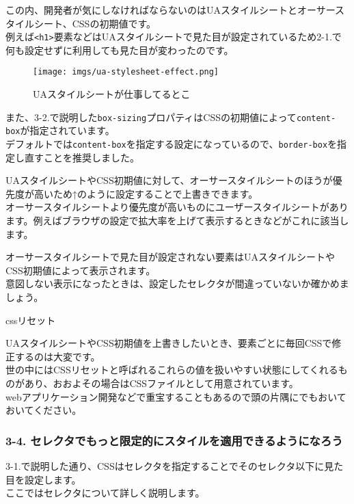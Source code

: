 この内、開発者が気にしなければならないのはUAスタイルシートとオーサースタイルシート、CSSの初期値です。\\
例えば\texttt{\textless{}h1\textgreater{}}要素などはUAスタイルシートで見た目が設定されているため2-1.で何も設定せずに利用しても見た目が変わったのです。

\begin{figure}
\centering
\texttt{[image: imgs/ua-stylesheet-effect.png]}
\caption{UAスタイルシートが仕事してるとこ}
\end{figure}

また、3-2.で説明した\texttt{box-sizing}プロパティはCSSの初期値によって\texttt{content-box}が指定されています。\\
デフォルトでは\texttt{content-box}を指定する設定になっているので、\texttt{border-box}を指定し直すことを推奨しました。

UAスタイルシートやCSS初期値に対して、オーサースタイルシートのほうが優先度が高いため↑のように設定することで上書きできます。\\
オーサースタイルシートより優先度が高いものにユーザースタイルシートがあります。例えばブラウザの設定で拡大率を上げて表示するときなどがこれに該当します。

オーサースタイルシートで見た目が設定されない要素はUAスタイルシートやCSS初期値によって表示されます。\\
意図しない表示になったときは、設定したセレクタが間違っていないか確かめましょう。

cssリセット

UAスタイルシートやCSS初期値を上書きしたいとき、要素ごとに毎回CSSで修正するのは大変です。\\
世の中にはCSSリセットと呼ばれるこれらの値を扱いやすい状態にしてくれるものがあり、おおよその場合はCSSファイルとして用意されています。\\
webアプリケーション開発などで重宝することもあるので頭の片隅にでもおいておいてください。

\subsubsection{3-4.
セレクタでもっと限定的にスタイルを適用できるようになろう}\label{ux30bbux30ecux30afux30bfux3067ux3082ux3063ux3068ux9650ux5b9aux7684ux306bux30b9ux30bfux30a4ux30ebux3092ux9069ux7528ux3067ux304dux308bux3088ux3046ux306bux306aux308dux3046}

3-1.で説明した通り、CSSはセレクタを指定することでそのセレクタ以下に見た目を設定します。\\
ここではセレクタについて詳しく説明します。

